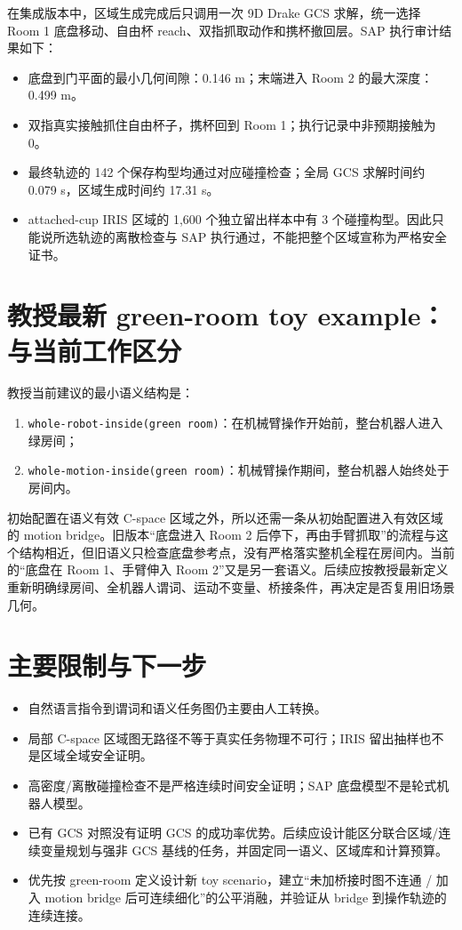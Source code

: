 \documentclass[UTF8,11pt,a4paper]{ctexart}
\begin{document}
在集成版本中，区域生成完成后只调用一次 9D Drake GCS 求解，统一选择 Room 1 底盘移动、自由杯 reach、双指抓取动作和携杯撤回层。SAP 执行审计结果如下：

\begin{itemize}
  \item 底盘到门平面的最小几何间隙：0.146 m；末端进入 Room 2 的最大深度：0.499 m。
  \item 双指真实接触抓住自由杯子，携杯回到 Room 1；执行记录中非预期接触为 0。
  \item 最终轨迹的 142 个保存构型均通过对应碰撞检查；全局 GCS 求解时间约 0.079 s，区域生成时间约 17.31 s。
  \item attached-cup IRIS 区域的 1,600 个独立留出样本中有 3 个碰撞构型。因此只能说所选轨迹的离散检查与 SAP 执行通过，不能把整个区域宣称为严格安全证书。
\end{itemize}

\section{教授最新 green-room toy example：与当前工作区分}

教授当前建议的最小语义结构是：
\begin{enumerate}[leftmargin=2em]
  \item \texttt{whole-robot-inside(green room)}：在机械臂操作开始前，整台机器人进入绿房间；
  \item \texttt{whole-motion-inside(green room)}：机械臂操作期间，整台机器人始终处于房间内。
\end{enumerate}

初始配置在语义有效 C-space 区域之外，所以还需一条从初始配置进入有效区域的 motion bridge。旧版本“底盘进入 Room 2 后停下，再由手臂抓取”的流程与这个结构相近，但旧语义只检查底盘参考点，没有严格落实整机全程在房间内。当前的“底盘在 Room 1、手臂伸入 Room 2”又是另一套语义。后续应按教授最新定义重新明确绿房间、全机器人谓词、运动不变量、桥接条件，再决定是否复用旧场景几何。

\section{主要限制与下一步}

\begin{itemize}
  \item 自然语言指令到谓词和语义任务图仍主要由人工转换。
  \item 局部 C-space 区域图无路径不等于真实任务物理不可行；IRIS 留出抽样也不是区域全域安全证明。
  \item 高密度/离散碰撞检查不是严格连续时间安全证明；SAP 底盘模型不是轮式机器人模型。
  \item 已有 GCS 对照没有证明 GCS 的成功率优势。后续应设计能区分联合区域/连续变量规划与强非 GCS 基线的任务，并固定同一语义、区域库和计算预算。
  \item 优先按 green-room 定义设计新 toy scenario，建立“未加桥接时图不连通 / 加入 motion bridge 后可连续细化”的公平消融，并验证从 bridge 到操作轨迹的连续连接。
\end{itemize}
\end{document}
